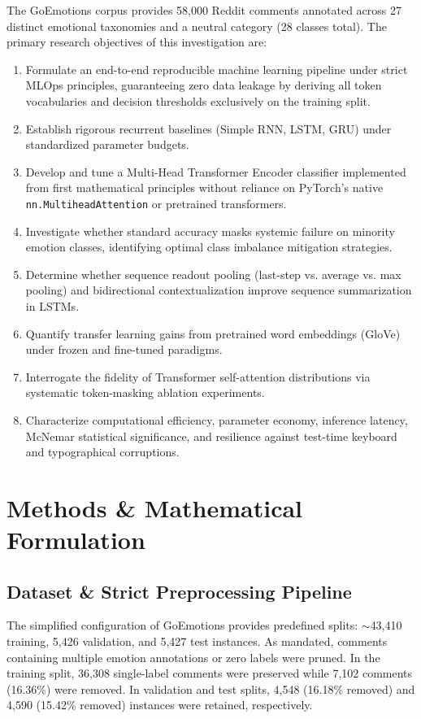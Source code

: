 \documentclass[10pt,twocolumn,letterpaper]{article}
\begin{document}
The GoEmotions corpus \cite{demszky2020goemotions} provides 58,000 Reddit comments annotated across 27 distinct emotional taxonomies and a neutral category (28 classes total). The primary research objectives of this investigation are:
\begin{enumerate}
    \item Formulate an end-to-end reproducible machine learning pipeline under strict MLOps principles, guaranteeing zero data leakage by deriving all token vocabularies and decision thresholds exclusively on the training split.
    \item Establish rigorous recurrent baselines (Simple RNN, LSTM, GRU) under standardized parameter budgets.
    \item Develop and tune a Multi-Head Transformer Encoder classifier implemented from first mathematical principles without reliance on PyTorch's native \texttt{nn.MultiheadAttention} or pretrained transformers.
    \item Investigate whether standard accuracy masks systemic failure on minority emotion classes, identifying optimal class imbalance mitigation strategies.
    \item Determine whether sequence readout pooling (last-step vs. average vs. max pooling) and bidirectional contextualization improve sequence summarization in LSTMs.
    \item Quantify transfer learning gains from pretrained word embeddings (GloVe) under frozen and fine-tuned paradigms.
    \item Interrogate the fidelity of Transformer self-attention distributions via systematic token-masking ablation experiments.
    \item Characterize computational efficiency, parameter economy, inference latency, McNemar statistical significance, and resilience against test-time keyboard and typographical corruptions.
\end{enumerate}

\section{Methods \& Mathematical Formulation}

\subsection{Dataset \& Strict Preprocessing Pipeline}
The simplified configuration of GoEmotions provides predefined splits: $\sim$43,410 training, 5,426 validation, and 5,427 test instances. As mandated, comments containing multiple emotion annotations or zero labels were pruned. In the training split, 36,308 single-label comments were preserved while 7,102 comments (16.36\%) were removed. In validation and test splits, 4,548 (16.18\% removed) and 4,590 (15.42\% removed) instances were retained, respectively.
\end{document}
